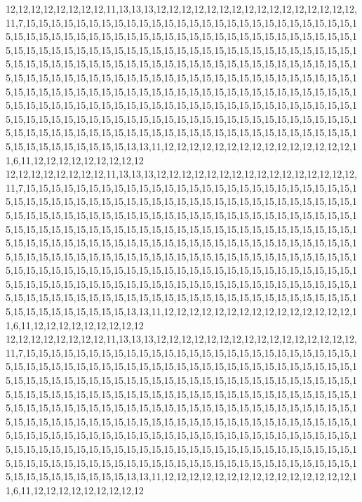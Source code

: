 12,12,12,12,12,12,12,12,11,13,13,13,12,12,12,12,12,12,12,12,12,12,12,12,12,12,12,12,11,7,15,15,15,15,15,15,15,15,15,15,15,15,15,15,15,15,15,15,15,15,15,15,15,15,15,15,15,15,15,15,15,15,15,15,15,15,15,15,15,15,15,15,15,15,15,15,15,15,15,15,15,15,15,15,15,15,15,15,15,15,15,15,15,15,15,15,15,15,15,15,15,15,15,15,15,15,15,15,15,15,15,15,15,15,15,15,15,15,15,15,15,15,15,15,15,15,15,15,15,15,15,15,15,15,15,15,15,15,15,15,15,15,15,15,15,15,15,15,15,15,15,15,15,15,15,15,15,15,15,15,15,15,15,15,15,15,15,15,15,15,15,15,15,15,15,15,15,15,15,15,15,15,15,15,15,15,15,15,15,15,15,15,15,15,15,15,15,15,15,15,15,15,15,15,15,15,15,15,15,15,15,15,15,15,15,15,15,15,15,15,15,15,15,15,15,15,15,15,15,15,15,15,15,15,15,15,15,15,15,15,15,15,15,15,15,15,15,15,15,15,15,15,15,15,15,15,15,15,15,15,15,15,15,15,15,15,15,15,15,15,15,15,15,15,15,15,15,15,15,15,15,15,15,15,15,15,15,15,15,15,13,13,11,12,12,12,12,12,12,12,12,12,12,12,12,12,12,12,11,6,11,12,12,12,12,12,12,12,12,12
12,12,12,12,12,12,12,12,11,13,13,13,12,12,12,12,12,12,12,12,12,12,12,12,12,12,12,12,11,7,15,15,15,15,15,15,15,15,15,15,15,15,15,15,15,15,15,15,15,15,15,15,15,15,15,15,15,15,15,15,15,15,15,15,15,15,15,15,15,15,15,15,15,15,15,15,15,15,15,15,15,15,15,15,15,15,15,15,15,15,15,15,15,15,15,15,15,15,15,15,15,15,15,15,15,15,15,15,15,15,15,15,15,15,15,15,15,15,15,15,15,15,15,15,15,15,15,15,15,15,15,15,15,15,15,15,15,15,15,15,15,15,15,15,15,15,15,15,15,15,15,15,15,15,15,15,15,15,15,15,15,15,15,15,15,15,15,15,15,15,15,15,15,15,15,15,15,15,15,15,15,15,15,15,15,15,15,15,15,15,15,15,15,15,15,15,15,15,15,15,15,15,15,15,15,15,15,15,15,15,15,15,15,15,15,15,15,15,15,15,15,15,15,15,15,15,15,15,15,15,15,15,15,15,15,15,15,15,15,15,15,15,15,15,15,15,15,15,15,15,15,15,15,15,15,15,15,15,15,15,15,15,15,15,15,15,15,15,15,15,15,15,15,15,15,15,15,15,15,15,15,15,15,15,15,15,15,15,15,15,13,13,11,12,12,12,12,12,12,12,12,12,12,12,12,12,12,12,11,6,11,12,12,12,12,12,12,12,12,12
12,12,12,12,12,12,12,12,11,13,13,13,12,12,12,12,12,12,12,12,12,12,12,12,12,12,12,12,11,7,15,15,15,15,15,15,15,15,15,15,15,15,15,15,15,15,15,15,15,15,15,15,15,15,15,15,15,15,15,15,15,15,15,15,15,15,15,15,15,15,15,15,15,15,15,15,15,15,15,15,15,15,15,15,15,15,15,15,15,15,15,15,15,15,15,15,15,15,15,15,15,15,15,15,15,15,15,15,15,15,15,15,15,15,15,15,15,15,15,15,15,15,15,15,15,15,15,15,15,15,15,15,15,15,15,15,15,15,15,15,15,15,15,15,15,15,15,15,15,15,15,15,15,15,15,15,15,15,15,15,15,15,15,15,15,15,15,15,15,15,15,15,15,15,15,15,15,15,15,15,15,15,15,15,15,15,15,15,15,15,15,15,15,15,15,15,15,15,15,15,15,15,15,15,15,15,15,15,15,15,15,15,15,15,15,15,15,15,15,15,15,15,15,15,15,15,15,15,15,15,15,15,15,15,15,15,15,15,15,15,15,15,15,15,15,15,15,15,15,15,15,15,15,15,15,15,15,15,15,15,15,15,15,15,15,15,15,15,15,15,15,15,15,15,15,15,15,15,15,15,15,15,15,15,15,15,15,15,15,15,13,13,11,12,12,12,12,12,12,12,12,12,12,12,12,12,12,12,11,6,11,12,12,12,12,12,12,12,12,12
